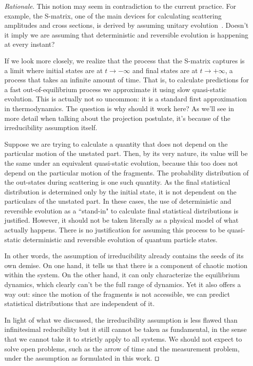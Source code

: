 \documentclass[smallextended]{svjour3}
\numberwithin{equation}{section}
\newenvironment{rationale}{\emph{Rationale}.}{\hfill\(\qed\)}
\theoremstyle{definition}
\newenvironment{rationale}{\emph{Rationale}.}{\qed}
\begin{document}
\begin{rationale}
	This notion may seem in contradiction to the current practice. For example, the S-matrix, one of the main devices for calculating scattering amplitudes and cross sections, is derived by assuming unitary evolution~\cite{Weinberg}. Doesn't it imply we are assuming that deterministic and reversible evolution is happening at every instant?
	
	If we look more closely, we realize that the process that the S-matrix captures is a limit where initial states are at $t \rightarrow - \infty$ and final states are at $t \rightarrow + \infty$, a process that takes an infinite amount of time.  That is, to calculate predictions for a fast out-of-equilibrium process we approximate it using slow quasi-static evolution. This is actually not so uncommon: it is a standard first approximation in thermodynamics. The question is why should it work here? As we'll see in more detail when talking about the projection postulate, it's because of the irreducibility assumption itself.
	
	Suppose we are trying to calculate a quantity that does not depend on the particular motion of the unstated part. Then, by its very nature, its value will be the same under an equivalent quasi-static evolution, because this too does not depend on the particular motion of the fragments. The probability distribution of the out-states during scattering is one such quantity. As the final statistical distribution is determined only by the initial state, it is not dependent on the particulars of the unstated part. In these cases, the use of deterministic and reversible evolution as a ``stand-in" to calculate final statistical distributions is justified. However, it should not be taken literally as a physical model of what actually happens. There is no justification for assuming this process to be quasi-static deterministic and reversible evolution of quantum particle states.
	
	In other words, the assumption of irreducibility already contains the seeds of its own demise. On one hand, it tells us that there is a component of chaotic motion within the system. On the other hand, it can only characterize the equilibrium dynamics, which clearly can't be the full range of dynamics. Yet it also offers a way out: since the motion of the fragments is not accessible, we can predict statistical distributions that are independent of it.
	
	In light of what we discussed, the irreducibility assumption is less flawed than infinitesimal reducibility but it still cannot be taken as fundamental, in the sense that we cannot take it to strictly apply to all systems. We should not expect to solve open problems, such as the arrow of time and the measurement problem, under the assumption as formulated in this work.
\end{rationale}
\end{document}
